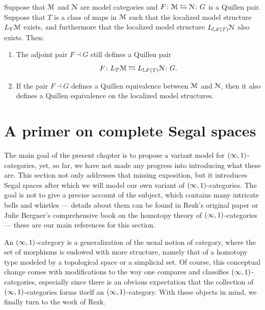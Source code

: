 \begin{theorem}\label{ap:: thm: transfer of localizations}
    Suppose that $\mathcal M$ and $\mathcal N$ are model categories and $F\colon \mathcal M \leftrightarrows \mathcal N\colon G$ is a Quillen pair. Suppose that $T$ is a class of maps in $\mathcal M$ such that the localized model structure $L_{T}\mathcal M$ exists, and furthermore that the localized model structure $L_{\mathbb{L}F(T)}\mathcal N$ also exists. Then:
    \begin{enumerate}
        \item The adjoint pair $F\dashv G$ still defines a Quillen pair
        \begin{equation}
            F\colon L_{T}\mathcal M \leftrightarrows L_{\mathbb{L}F(T)}\mathcal N \colon G.
        \end{equation}
        \item If the pair $F\dashv G$ defines a Quillen equivalence between $\mathcal M$ and $\mathcal N$, then it also defines a Quillen equivalence on the localized model structures.
    \end{enumerate}
\end{theorem}





\section{A primer on complete Segal spaces}
\label{ch2:: sec: complete_segal_spaces}

The main goal of the present chapter is to propose a variant model for $(\operatorname{\infty},1)$-categories, yet, so far, we have not made any progress into introducing what these are. This section not only addresses that missing exposition, but it introduces Segal spaces after which we will model our own variant of $(\operatorname{\infty},1)$-categories. The goal is not to give a precise account of the subject, which contains many intricate bells and whistles — details about them can be found in Rezk's original paper \cite{Rezk01} or Julie Bergner's comprehensive book on the homotopy theory of $(\operatorname{\infty},1)$-categories \cite{Ber18} — these are our main references for this section.

An $(\operatorname{\infty},1)$-category is a generalization of the usual notion of category, where the set of morphisms is endowed with more structure, namely that of a homotopy type modeled by a topological space or a simplicial set. Of course, this conceptual change comes with modifications to the way one compares and classifies $(\operatorname{\infty},1)$-categories, especially since there is an obvious expectation that the collection of $(\operatorname{\infty},1)$-categories forms itself an $(\operatorname{\infty},1)$-category. With these objects in mind, we finally turn to the work of Rezk.

